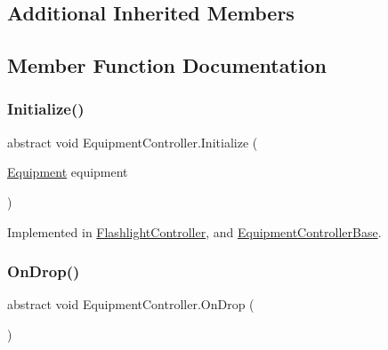 \subsection*{Additional Inherited Members}


\subsection{Member Function Documentation}
\mbox{\label{class_equipment_controller_a7eeee15beb95a3111424c83de2aa809b}} 
\subsubsection{\texorpdfstring{Initialize()}{Initialize()}}
{\footnotesize\ttfamily abstract void Equipment\+Controller.\+Initialize (\begin{DoxyParamCaption}\item[{\mbox{\hyperlink{class_equipment}{Equipment}}}]{equipment }\end{DoxyParamCaption})\hspace{0.3cm}{\ttfamily [pure virtual]}}



Implemented in \mbox{\hyperlink{class_flashlight_controller_a3bc506518b599e1f8af7dfacb2180b35}{Flashlight\+Controller}}, and \mbox{\hyperlink{class_equipment_controller_base_a2bd9dfc6d920c98460436504145ebe6f}{Equipment\+Controller\+Base}}.

\mbox{\label{class_equipment_controller_a27bdee4dd8690d8f72a7c7941104bb83}} 
\subsubsection{\texorpdfstring{On\+Drop()}{OnDrop()}}
{\footnotesize\ttfamily abstract void Equipment\+Controller.\+On\+Drop (\begin{DoxyParamCaption}{ }\end{DoxyParamCaption})\hspace{0.3cm}{\ttfamily [pure virtual]}}



